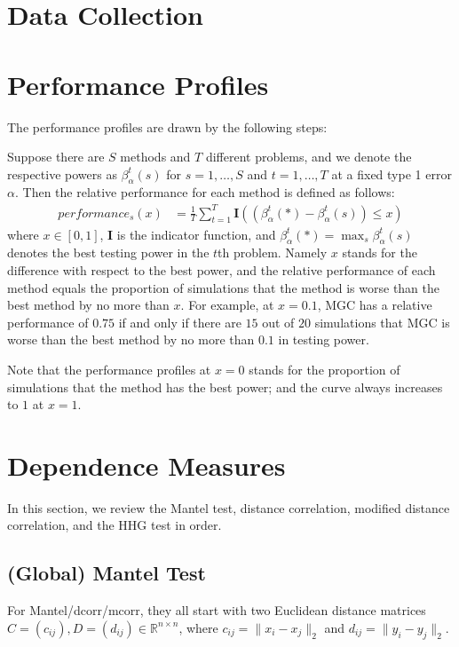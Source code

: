 \documentclass[11pt]{article}
\providecommand{\mb}[1]{\boldsymbol{#1}}
\newcommand{\Real}{\mathbb{R}}
\begin{document}
\section{Data Collection}



\section{Performance Profiles}
\label{appen:profiles}
The performance profiles are drawn by the following steps:

Suppose there are $S$ methods and $T$ different problems, and we denote the respective powers as $\beta_{\alpha}^{t}(s)$ for $s=1,\ldots,S$ and $t=1,\ldots,T$ at a fixed type 1 error $\alpha$. Then the relative performance for each method is defined as follows:
\begin{align*}
performance_{s}(x) &= \frac{1}{T} \sum_{t=1}^{T} \mb{I}((\beta_{\alpha}^{t}(*)-\beta_{\alpha}^{t}(s)) \leq x)
\end{align*}
where $x \in [0,1]$, $\mb{I}$ is the indicator function, and $\beta_{\alpha}^{t}(*) =\max_{s} \beta_{\alpha}^{t}(s)$ denotes the best testing power in the $t$th problem. Namely $x$ stands for the difference with respect to the best power, and the relative performance of each method equals the proportion of simulations that the method is worse than the best method by no more than $x$. For example, at $x=0.1$, MGC has a relative performance of $0.75$ if and only if there are $15$ out of $20$ simulations that MGC is worse than the best method by no more than $0.1$ in testing power. 

Note that the performance profiles at $x=0$ stands for the proportion of simulations that the method has the best power; and the curve always increases to $1$ at $x=1$. 

\section{Dependence Measures}
\label{appen:methods}



In this section, we review the Mantel test, distance correlation, modified distance correlation, and the HHG test in order.

\subsection{(Global) Mantel Test}
\label{appen:mantel}
For Mantel/dcorr/mcorr, they all start with two Euclidean distance matrices $C=(c_{ij}), D=(d_{ij}) \in \Real^{n \times n}$, where $c_{ij}=\|x_{i}-x_{j}\|_{2}$ and $d_{ij}=\|y_{i}-y_{j}\|_{2}$. 
\end{document}
